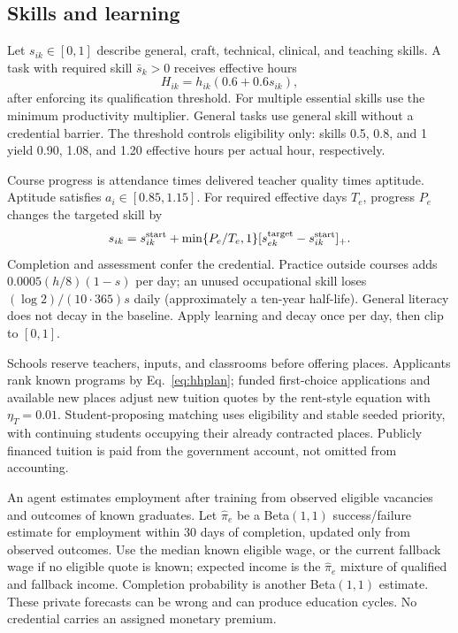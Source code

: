 \documentclass[10pt,a4paper,twocolumn]{article}
\begin{document}
\subsection{Skills and learning}
Let $s_{ik}\in[0,1]$ describe general, craft, technical, clinical, and
teaching skills. A task with required skill $\bar s_k>0$ receives effective
hours
\begin{equation}
 H_{ik}=h_{ik}(0.6+0.6s_{ik}),
 \label{eq:productivity}
\end{equation}
after enforcing its qualification threshold. For multiple essential
skills use the minimum productivity multiplier. General tasks use general skill without a credential barrier.
The threshold controls eligibility only: skills 0.5, 0.8, and 1 yield
0.90, 1.08, and 1.20 effective hours per actual hour, respectively.

Course progress is attendance times delivered teacher quality times
aptitude. Aptitude satisfies $a_i\in[0.85,1.15]$. For required effective
days $T_e$, progress $P_e$ changes the targeted skill by
\begin{equation}
 s_{ik}=s^{\rm start}_{ik}
 +\min\{P_e/T_e,1\}
 [s^{\rm target}_{ek}-s^{\rm start}_{ik}]_+.
\end{equation}
Completion and assessment confer the credential. Practice outside
courses adds $0.0005(h/8)(1-s)$ per day; an unused occupational skill
loses $(\log 2)/(10\cdot365)s$ daily (approximately a ten-year half-life). General literacy does not decay in the baseline.
Apply learning and decay once per day, then clip to $[0,1]$.

Schools reserve teachers, inputs, and classrooms before offering places.
Applicants rank known programs by Eq.~\eqref{eq:hhplan}; funded
first-choice applications and available new places adjust new tuition
quotes by the rent-style equation with $\eta_T=0.01$. Student-proposing
matching uses eligibility and stable seeded priority, with continuing
students occupying their already contracted places. Publicly financed
tuition is paid from the government account, not omitted from accounting.

An agent estimates employment after training from observed eligible
vacancies and outcomes of known graduates. Let $\hat\pi_e$ be a
Beta$(1,1)$ success/failure estimate for employment within 30 days of
completion, updated only from observed outcomes. Use the median known
eligible wage, or the current fallback wage if no eligible quote is
known; expected income is the $\hat\pi_e$ mixture of qualified and
fallback income. Completion probability is another Beta$(1,1)$ estimate.
These private forecasts can be wrong and can produce education cycles.
No credential carries an assigned monetary premium.
\end{document}
